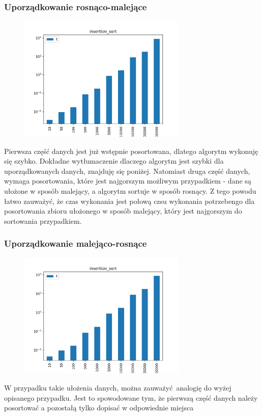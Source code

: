 \documentclass[]{article}
\begin{document}
		\subsubsection{Uporządkowanie rosnąco-malejące}
			\begin{figure}[H]
				\centering
				\includegraphics[width=8cm]{insertion_sort_a.png}	
			\end{figure}
			Pierwsza część danych jest już wstępnie posortowana, dlatego algorytm wykonuję się szybko. Dokładne wytłumaczenie dlaczego algorytm jest szybki dla uporządkowanych danych, znajduję się poniżej. Natomiast druga część danych, wymaga posortowania, które jest najgorszym możliwym przypadkiem - dane są ułożone w sposób malejący, a algorytm sortuje w sposób rosnący. Z tego powodu łatwo zauważyć, że czas wykonania jest połową czsu wykonania potrzebengo dla posortowania zbioru ułożonego w sposób malejący, który jest najgorszym do sortowania przypadkiem. 
			\subsubsection{Uporządkowanie malejąco-rosnące}
			\begin{figure}[H]
				\centering
				\includegraphics[width=8cm]{insertion_sort_v.png}	
			\end{figure}
			W przypadku takie ułożenia danych, można zauważyć analogię do wyżej opisanego przypadku. Jest to spowodowane tym, że pierwszą część danych należy posortować a pozostałą tylko dopisać w odpowiednie miejsca
\end{document}
